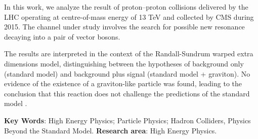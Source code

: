 In this work, we analyze the result of proton--proton collisions delivered by the LHC operating at centre-of-mass energy of 13 TeV and collected by CMS during 2015. The channel under study involves the search for possible new resonance decaying into a pair of vector bosons. 

The results are interpreted in the context of the Randall-Sundrum warped extra dimensions model, distinguishing between the  hypotheses of background only (standard model) and background plus signal (standard model + graviton).  No evidence of the existence of a graviton-like particle was found, leading to the conclusion that this reaction does not challenge the predictions of the standard model .


\vskip 1.0cm
\noindent
{\bf Key Words}: High Energy Physics; Particle Physics; Hadron Colliders, Physics Beyond the Standard Model.
\vskip 0.5cm
\noindent
{\bf Research area}: High Energy Physics.


\vfill \eject
